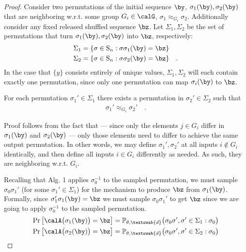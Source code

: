 \begin{proof}

Consider two permutations of the initial sequence $\by$, $\sigma_1(\by), \sigma_2(\by)$ that are neighboring w.r.t. some group $G_i \in \calG$, $\sigma_1 \approx_{G_i} \sigma_2$. Additionally consider any fixed released shuffled sequence $\bz$. Let $\Sigma_1, \Sigma_2$ be the set of permutations that turn $\sigma_1(\by), \sigma_2(\by)$ into $\bz$, respectively: 
\begin{align*}
    \Sigma_1 
    & = \{\sigma \in \mathrm{S}_n : \sigma \sigma_1(\by) = \bz \} \\
    \Sigma_2 
    & = \{\sigma \in \mathrm{S}_n : \sigma \sigma_2(\by) = \bz \} \quad .
\end{align*}
In the case that $\{y\}$ consists entirely of unique values, $\Sigma_1, \Sigma_2$ will each contain exactly one permutation, since only one permutation can map $\sigma_i(\by)$ to $\bz$. 

\begin{lemma}
For each permutation $\sigma_1' \in \Sigma_1$ there exists a permutation in $\sigma_2' \in \Sigma_2$ such that 
\begin{align*}
    \sigma_1' \approx_{G_i} \sigma_2' \quad . 
\end{align*}
\end{lemma}
Proof follows from the fact that --- since only the elements $j \in G_i$ differ in $\sigma_1(\by)$ and $\sigma_2(\by)$ --- only those elements need to differ to achieve the same output permutation. In other words, we may define $\sigma_1', \sigma_2'$ at all inputs $i \notin G_i$ identically, and then define all inputs $i \in G_i$ differently as needed. As such, they are neighboring w.r.t. $G_i$. 

Recalling that Alg. 1 applies $\sigma_0^{-1}$ to the sampled permutation, we must sample $\sigma_0\sigma_1'$ (for some $\sigma_1' \in \Sigma_1$) for the mechanism to produce $\bz$ from $\sigma_1(\by)$. Formally, since $\sigma_1' \sigma_1 (\by) = \bz$ we must sample $\sigma_0 \sigma_1'$ to get $\bz$ since we are going to apply $\sigma_0^{-1}$ to the sampled permutation. 
\begin{align*}
    \Pr\big[ \calA \big( \sigma_1(\by) \big) = \bz \big] 
    &= \mathbb{P}_{\theta,\textswab{d}}\big(\sigma_0\sigma', \sigma' \in \Sigma_1 : \sigma_0\big) \\
    \Pr\big[ \calA \big( \sigma_2(\by) \big) = \bz \big] 
    &= \mathbb{P}_{\theta,\textswab{d}}\big(\sigma_0\sigma', \sigma' \in \Sigma_2 : \sigma_0\big) 
\end{align*}


\end{proof}

